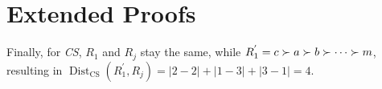
\chapter{Extended Proofs}

\label{AppendixA} %

Finally, for \textit{CS}, $R_{1}$ and $R_{j}$ stay the same, while $R_{1}^{'} = c \succ a \succ b \succ \cdots \succ m$, resulting in $\operatorname{Dist}_{\text{CS}}(R_{1}^{'}, R_{j}) = |2-2| + |1-3| + |3-1| = 4$.

